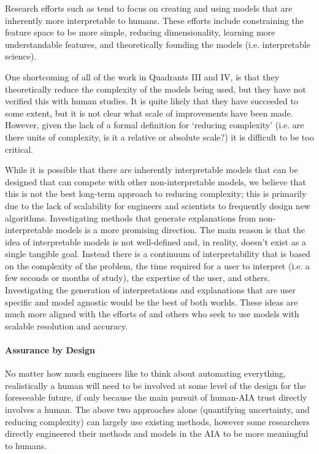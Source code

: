     Research efforts such as \cite{Caruana2015-za,Huysmans2011-th,Faghmous2014-og,Venna2007-yj,Vellido2012-nm,Kadous1999-rx,Lomas2012-ie} tend to focus on creating and using models that are inherently more interpretable to humans. These efforts include constraining the feature space to be more simple, reducing dimensionality, learning more understandable features, and theoretically founding the models (i.e. interpretable science).

    One shortcoming of all of the work in Quadrants III and IV, is that they theoretically reduce the complexity of the models being used, but they have not verified this with human studies. It is quite likely that they have succeeded to some extent, but it is not clear what scale of improvements have been made. However, given the lack of a formal definition for `reducing complexity' (i.e. are there units of complexity, is it a relative or absolute scale?) it is difficult to be too critical.
    
    While it is possible that there are inherently interpretable models that can be designed that can compete with other non-interpretable models, we believe that this is not the best long-term approach to reducing complexity; this is primarily due to the lack of scalability for engineers and scientists to frequently design new algorithms. Investigating methods that generate explanations from non-interpretable models is a more promising direction. The main reason is that the idea of interpretable models is not well-defined and, in reality, doesn't exist as a single tangible goal. Instead there is a continuum of interpretability that is based on the complexity of the problem, the time required for a user to interpret (i.e. a few seconds or months of study), the expertise of the user, and others. Investigating the generation of interpretations and explanations that are user specific and model agnostic would be the best of both worlds. These ideas are much more aligned with the efforts of \cite{Ruping2006-xj} and others who seek to use models with scalable resolution and accuracy.

    \paragraph{Assurance by Design} No matter how much engineers like to think about automating everything, realistically a human will need to be involved at some level of the design for the foreseeable future, if only because the main pursuit of human-AIA trust directly involves a human. The above two approaches alone (quantifying uncertainty, and reducing complexity) can largely use existing methods, however some researchers directly engineered their methods and models in the AIA to be more meaningful to humans.

